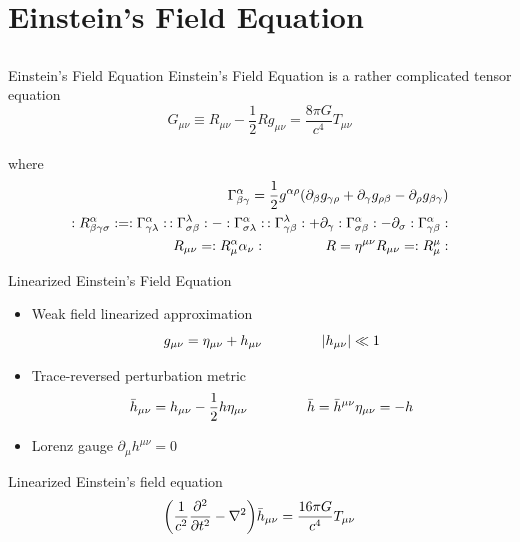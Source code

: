 \documentclass{beamer}
\newcommand{\bea}{\setlength{\jot}{10pt}\begin{eqnarray*}}
\newcommand{\eea}{\end{eqnarray*}}
\theoremstyle{definition}
\theoremstyle{plain}
\begin{document}
\section{Einstein's Field Equation}
\subsection{}
\begin{frame}{Einstein's Field Equation}
	Einstein's Field Equation is a rather complicated tensor equation
	\vspace{0.8cm}
	\\
	\[
	G_{\mu \nu} \equiv R_{\mu \nu} - \dfrac{1}{2} R g_{\mu \nu} = 
\dfrac{8 \pi G}{c^4} T_{\mu \nu}
	\]
	\vspace{0.8cm}
	\\
	where
\bea
\Gamma ^{\alpha} _{\beta \gamma} = 
\dfrac{1}{2} g^{\alpha \rho} \qty(
\partial_\beta g_{\gamma \rho} + 
\partial_\gamma g_{\rho \beta} -
\partial_\rho g_{\beta \gamma}
)
\\
: R^\alpha _{\beta \gamma \sigma}:
=
:\Gamma ^\alpha _{\gamma \lambda}:\,
:\Gamma ^\lambda _{\sigma \beta}:
-
:\Gamma ^\alpha _{\sigma \lambda}:\,
:\Gamma ^\lambda _{\gamma \beta}:
+
\partial_\gamma :\Gamma^\alpha _{\sigma \beta}: 
-
\partial_\sigma :\Gamma^\alpha _{\gamma \beta} :
\\
R_{\mu \nu} = :R^\alpha _\mu \alpha _\nu: \hspace{1.5cm}
R=\eta^{\mu \nu} R_{\mu \nu} = :R^{\mu} _\mu:
\eea	
\end{frame}

\begin{frame}{Linearized Einstein's Field Equation}
\begin{itemize}
\item Weak field linearized approximation
	\[
	g_{\mu \nu} = \eta_{\mu \nu} + h_{\mu \nu} \hspace{1.5cm}
	\abs{h_{\mu \nu}}\ll 1
	\]
\item Trace-reversed perturbation metric
\[
\bar{h} _{\mu \nu} = h_{\mu \nu} - \dfrac{1}{2} h \eta_{\mu \nu} \hspace{1.5cm} \bar{h}=\bar{h}^{\mu \nu} \eta_{\mu \nu} = - h
\]
\item Lorenz gauge $\partial_{\mu} h^{\mu \nu}=0$\\ 
\vspace{0.5cm}
\end{itemize}
Linearized Einstein's field equation
\\
\vspace{0.3cm}
\[
\qty(
\dfrac{1}{c^{2}}
\pdv[2]{}{t}
-
\nabla ^{2}
)
\bar{h} _{\mu \nu} =\dfrac{16 \pi G}{c^{4}} T_{\mu \nu}
\]
\end{frame}
\end{document}

